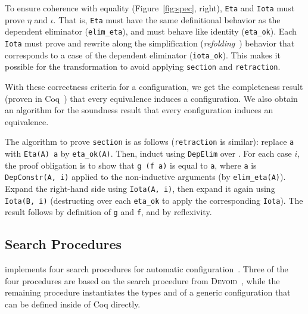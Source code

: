 To ensure coherence with equality (Figure~\ref{fig:spec}, right),
\lstinline{Eta} and \lstinline{Iota} must prove $\eta$ and $\iota$.
That is, \lstinline{Eta} must have the same definitional behavior as the dependent eliminator (\lstinline{elim_eta}),
and must behave like identity (\lstinline{eta_ok}).
Each \lstinline{Iota} must prove and rewrite along the simplification (\textit{refolding}~\cite{boutillier:tel-01054723}) behavior that corresponds to a case of the dependent eliminator (\lstinline{iota_ok}).
This makes it possible for the transformation to
avoid applying \lstinline{section} and \lstinline{retraction}.

With these correctness criteria for a configuration, we get the completeness result (proven in Coq~\href{https://github.com/uwplse/pumpkin-pi/blob/v2.0.0/plugin/coq/playground/arbitrary.v}{}) that every equivalence induces a configuration. %
We also obtain an algorithm for the soundness result that every configuration induces an equivalence.

The algorithm to prove \lstinline{section} is as follows (\lstinline{retraction} is similar):
replace \lstinline{a} with \lstinline{Eta(A) a} by \lstinline{eta_ok(A)}.
Then, induct using \lstinline{DepElim} over \Aa.
For each case $i$, the proof obligation is to show that \lstinline{g (f a)} is equal to \lstinline{a},
where \lstinline{a} is \lstinline{DepConstr(A, i)} applied to the non-inductive arguments (by \lstinline{elim_eta(A)}).
Expand the right-hand side using \lstinline{Iota(A, i)}, then expand it again using \lstinline{Iota(B, i)}
(destructing over each \lstinline{eta_ok} to apply the corresponding \lstinline{Iota}).
The result follows by definition of \lstinline{g} and \lstinline{f}, and by reflexivity.

\subsection{Search Procedures}

\toolnamec implements four search procedures for automatic configuration~\href{https://github.com/uwplse/pumpkin-pi/blob/v2.0.0/plugin/src/automation/lift/liftconfig.ml}{}.
Three of the four procedures are based on the search procedure from 
\textsc{Devoid}~\cite{Ringer2019},
while the remaining procedure instantiates the types \Aa and \B of a generic configuration that can be defined inside of Coq directly.

